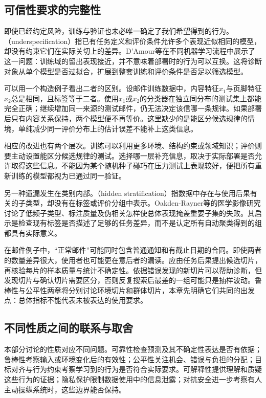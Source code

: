 \subsection{可信性要求的完整性}

即使已经约定风险，训练与验证也未必唯一确定了我们希望得到的行为。（underspecification）指已有任务定义和评价条件允许多个表现近似相同的模型，却没有约束它们在实际关切上的差异。D'Amour等在不同机器学习流程中展示了这一问题：训练域的留出表现接近，并不意味着部署时的行为可以互换。这将诊断对象从单个模型是否过拟合，扩展到整套训练和评价条件是否足以筛选模型。

可以用一个构造例子看出二者的区别。设邮件训练数据中，内容特征$x_1$与页脚特征$x_2$总是相同，且标签等于二者。使用$x_1$或$x_2$的分类器在独立同分布的测试集上都能完全正确；继续增加同一来源的测试邮件，仍无法决定该信哪一条规律。如果部署后只有内容关系保持，两个模型便不再等价。这里缺少的是能区分候选规律的情境，单纯减少同一评价分布上的估计误差不能补上这类信息。

相应的改进也有两个层次。训练可以利用更多环境、结构约束或领域知识；评价则要主动设置能区分候选规律的测试。选择哪一层补充信息，取决于实际部署是否允许取得这些信息。不能因为某个随机种子碰巧在压力测试上表现较好，便把所有重新训练的模型都视为已通过同一验证。

另一种遗漏发生在类别内部。（hidden stratification）指数据中存在与使用后果有关的子类型，却没有在标签或评价分组中表示。Oakden-Rayner等的医学影像研究讨论了低频子类型、标注质量及伪相关怎样使总体表现掩盖重要子集的失败。其启示是检查现有标签是否描述了足够的任务差异，而不是认定所有自动聚类得到的组都具有实际意义。

在邮件例子中，“正常邮件”可能同时包含普通通知和有截止日期的合同。即使两者的数量差异很大，使用者也可能更在意后者的漏读。应由任务后果提出候选切片，再核验每片的样本质量与统计不确定性。依据错误发现的新切片可以帮助诊断，但发现切片与确认切片需要区分，否则反复搜索后最差的一组可能只是抽样波动。鲁棒性与公平性两章将分别讨论环境切片和群体切片，本章先明确它们共同的出发点：总体指标不能代表未被表达的使用要求。

\subsection{不同性质之间的联系与取舍}

本部分讨论的性质对应不同问题。可靠性检查预测及其不确定性表达是否有依据；鲁棒性考察输入或环境变化后的有效性；公平性关注机会、错误与负担的分配；目标对齐与行为约束考察学习到的行为是否符合实际要求。可解释性提供理解和质疑这些行为的证据；隐私保护限制数据使用中的信息泄露；对抗安全进一步考察有人主动操纵系统时，这些边界能否保持。

